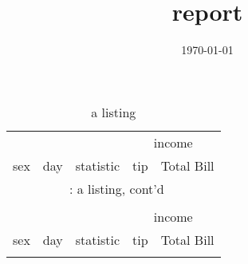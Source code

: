 \documentclass{article}
\title{ report }
\date{\today}
\begin{document}
\maketitle
\clearpage
\listoftables
\newpage
\listoffigures
\newpage
\hypertarget{a listing}{} 
\begin{longtable}{p{3cm}llll}
\caption{a listing}\\
\toprule
\multicolumn{3}{c}{}&\multicolumn{2}{c}{income} \\
\cmidrule(lr){4-5}
sex & day & statistic & tip & Total Bill\\
\hline
\endfirsthead
\multicolumn{5}{c}{\tablename~\thetable{}: a listing, cont'd}\\\\
\toprule
\multicolumn{3}{c}{}&\multicolumn{2}{c}{income} \\
\cmidrule(lr){4-5}
sex & day & statistic & tip & Total Bill\\
\hline
\endhead \hline \endfoot \hline


\end{longtable}
\end{document}
